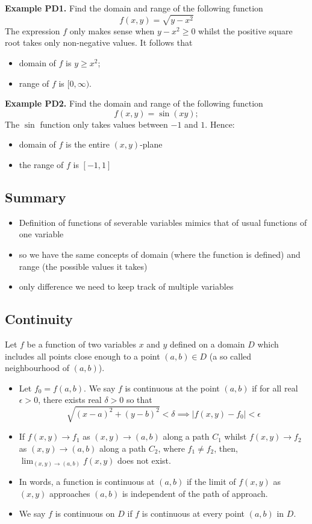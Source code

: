 \documentclass{article}
\begin{document}
\textbf{Example PD1.} Find the domain and range of the following
function
$$
f(x,y)= \sqrt{y-x^2}
$$
The expression $f$ only makes sense when $ y-x^2 \geq 0$ whilst the positive square root takes only non-negative values.
It follows that
\begin{itemize}
\item
domain of $f$ is $ y \geq x^2$;
\item
range of $f$ is $ [0, \infty).$
\end{itemize}
\textbf{Example PD2.} Find the domain and range of the following
function
$$
f(x,y)= \sin (xy);
$$
The $\sin$ function only takes values between $-1$ and $1$. Hence:
\begin{itemize}
\item
domain of $f$ is the entire $(x,y)$-plane
\item
the range of $f$ is $ [-1,1]$
\end{itemize}


\subsection{Summary}

\begin{itemize}
\item
Definition of functions of severable variables mimics that of usual functions of one variable
\item so we have the same concepts of domain (where the function is defined) and range (the possible values it takes)
\item
only difference we need to keep track of multiple variables
\end{itemize}


\subsection{Continuity}

Let $f$ be a function of two variables $x$ and $y$ defined on a domain 
$D$ which includes all points close enough to a point $(a,b) \in D$ (a so called neighbourhood
of $(a,b)$).
\begin{itemize}
\item
Let $f_0 = f(a,b)$. We say $f$ is continuous at the point $(a,b)$ if for all real $\epsilon >0$,
there exists real $\delta > 0$ so that 
$$
\sqrt{ (x-a)^2 +(y-b)^2 } < \delta \implies |f(x,y)-f_0|< \epsilon
$$

\item
If $f(x,y) \to f_1$ as $(x,y) \to (a, b)$ along a path $C_1$
whilst $f(x,y) \to f_2$ as $(x,y) \to (a, b)$ along a path
$C_2$, where $f_1 \ne f_2$, then, $ \lim_{(x,y) \to (a,b)} f(x,y)$ does
not exist.
\item
In words, a function is continuous at $(a,b)$ if the limit of
$f(x,y)$ as $(x,y)$ approaches $(a,b)$ is independent of the 
path of approach.
\item
We say $f$ is continuous on $D$ if $f$ is continuous at every
point $(a,b)$ in $D$.
\end{itemize}
\end{document}
